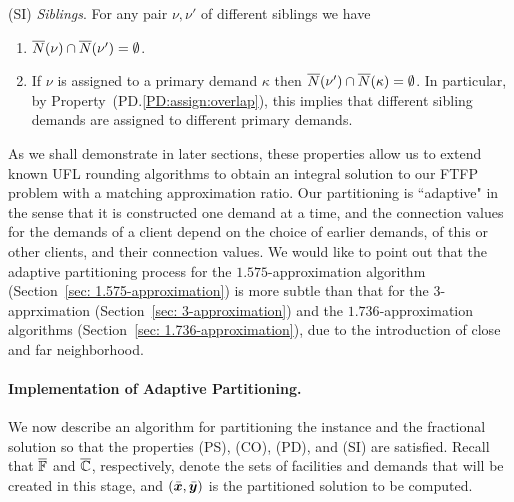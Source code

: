 \documentclass[oneside,final]{ucr}
\begin{document}
\begin{description}
\begin{enumerate}
\begin{enumerate}
			\end{enumerate}

	\end{enumerate}
	
\item{(SI)} \emph{Siblings}. For any pair $\nu,\nu'$ of different siblings we have
  \begin{enumerate}

	\item \label{SI:siblings disjoint}
		  ${\overline{N}}(\nu)\cap {\overline{N}}(\nu') = \emptyset$.
		
	\item \label{SI:primary disjoint} If $\nu$ is assigned to a primary demand $\kappa$ then
 		${\overline{N}}(\nu')\cap {\overline{N}}(\kappa) = \emptyset$. In particular, by Property~(PD.\ref{PD:assign:overlap}),
		this implies that different sibling demands are assigned to different primary demands.

	\end{enumerate}
	
\end{description}

As we shall demonstrate in later sections, these properties allow us
to extend known UFL rounding algorithms to obtain an integral solution
to our FTFP problem with a matching approximation ratio. Our
partitioning is ``adaptive" in the sense that it is constructed one
demand at a time, and the connection values for the demands of a
client depend on the choice of earlier demands, of this or other
clients, and their connection values. We would like to point out that
the adaptive partitioning process for the $1.575$-approximation
algorithm (Section~\ref{sec: 1.575-approximation}) is more subtle than that for 
the $3$-apprximation (Section~\ref{sec: 3-approximation}) and the
$1.736$-approximation algorithms (Section~\ref{sec:
  1.736-approximation}), due to the introduction of close and far
neighborhood.


\paragraph{Implementation of Adaptive Partitioning.}
We now describe an algorithm for partitioning the instance
and the fractional solution so that the properties (PS),
(CO), (PD), and (SI) are satisfied.  Recall that
$\overline{\mathbb{F}}$ and $\overline{\mathbb{C}}$, respectively, denote the
sets of facilities and demands that will be created in this
stage, and $(\bar{\boldsymbol{x}},\bar{\boldsymbol{y}})$ is the partitioned solution
to be computed. 
\end{document}
